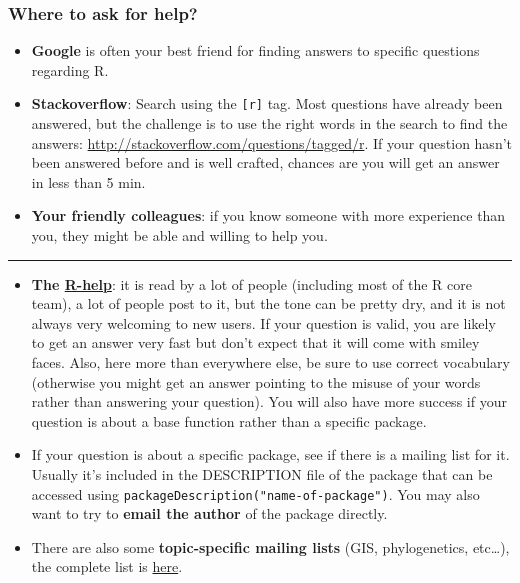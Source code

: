 \documentclass[
]{article}
\providecommand{\tightlist}{%
  \setlength{\itemsep}{0pt}\setlength{\parskip}{0pt}}
\begin{document}
\hypertarget{where-to-ask-for-help}{%
\subsubsection{Where to ask for help?}\label{where-to-ask-for-help}}

\begin{itemize}
\item
  \textbf{Google} is often your best friend for finding answers to
  specific questions regarding R.
\item
  \textbf{Stackoverflow}: Search using the \texttt{{[}r{]}} tag. Most
  questions have already been answered, but the challenge is to use the
  right words in the search to find the answers:
  \url{http://stackoverflow.com/questions/tagged/r}. If your question
  hasn't been answered before and is well crafted, chances are you will
  get an answer in less than 5 min.
\item
  \textbf{Your friendly colleagues}: if you know someone with more
  experience than you, they might be able and willing to help you.
\end{itemize}

\begin{center}\rule{0.5\linewidth}{0.5pt}\end{center}

\begin{itemize}
\tightlist
\item
  \textbf{The
  \href{https://stat.ethz.ch/mailman/listinfo/r-help}{R-help}}: it is
  read by a lot of people (including most of the R core team), a lot of
  people post to it, but the tone can be pretty dry, and it is not
  always very welcoming to new users. If your question is valid, you are
  likely to get an answer very fast but don't expect that it will come
  with smiley faces. Also, here more than everywhere else, be sure to
  use correct vocabulary (otherwise you might get an answer pointing to
  the misuse of your words rather than answering your question). You
  will also have more success if your question is about a base function
  rather than a specific package.
\item
  If your question is about a specific package, see if there is a
  mailing list for it. Usually it's included in the DESCRIPTION file of
  the package that can be accessed using
  \texttt{packageDescription("name-of-package")}. You may also want to
  try to \textbf{email the author} of the package directly.
\item
  There are also some \textbf{topic-specific mailing lists} (GIS,
  phylogenetics, etc\ldots), the complete list is
  \href{http://www.r-project.org/mail.html}{here}.
\end{itemize}
\end{document}
